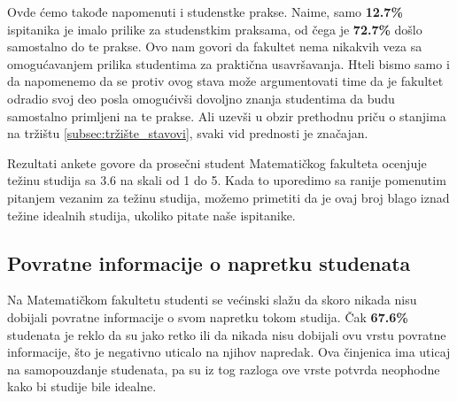 \documentclass[a4paper]{article}
\begin{document}
{Ovde ćemo takođe napomenuti i studenstke prakse. Naime, samo \textbf{12.7\%} ispitanika je imalo prilike za studenstkim praksama, od čega je \textbf{72.7\%} došlo samostalno do te prakse. Ovo nam govori da fakultet nema nikakvih veza sa omogućavanjem prilika studentima za praktična usavršavanja. Hteli bismo samo i da napomenemo da se protiv ovog stava može argumentovati time da je fakultet odradio svoj deo posla omogućivši dovoljno znanja studentima da budu samostalno primljeni na te prakse. Ali uzevši u obzir prethodnu priču o stanjima na tržištu \ref{subsec:tržište_stavovi}, svaki vid prednosti je značajan.

Rezultati ankete govore da prosečni student Matematičkog fakulteta ocenjuje težinu studija sa 3.6 na skali od 1 do 5. Kada to uporedimo sa ranije pomenutim pitanjem vezanim za težinu studija, možemo primetiti da je ovaj broj blago iznad težine idealnih studija, ukoliko pitate naše ispitanike.

\subsection{Povratne informacije o napretku studenata}
\label{subsec:napredak_iskustva}
Na Matematičkom fakultetu studenti se većinski slažu da skoro nikada nisu dobijali povratne informacije o svom napretku tokom studija. Čak \textbf{67.6\%} studenata je reklo da su jako retko ili da nikada nisu dobijali ovu vrstu povratne informacije, što je negativno uticalo na njihov napredak. Ova činjenica ima uticaj na samopouzdanje studenata, pa su iz tog razloga ove vrste potvrda neophodne kako bi studije bile idealne.

\begin{figure}[h!]
\begin{center}
\end{center}
\end{figure}}
\end{document}
